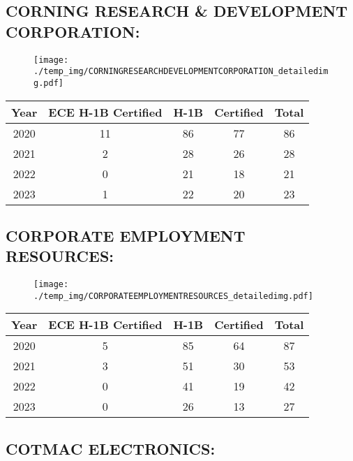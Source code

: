 \documentclass{article}%
\begin{document}
%
\newpage%
\subsection{CORNING RESEARCH \& DEVELOPMENT CORPORATION:}%
\label{subsec:CORNINGRESEARCHDEVELOPMENTCORPORATION}%
\label{CORNINGRESEARCHDEVELOPMENTCORPORATIONdetailed}%


\begin{figure}[htbp]%
\centering%
\texttt{[image: ./temp\_img/CORNINGRESEARCHDEVELOPMENTCORPORATION\_detailedimg.pdf]}%
\end{figure}

%
\begin{longtable}{c|c|c|c|c}%
\hline%
Year&ECE H{-}1B Certified&H{-}1B&Certified&Total\\%
\hline%
2020&11&86&77&86\\%
\hline%
2021&2&28&26&28\\%
\hline%
2022&0&21&18&21\\%
\hline%
2023&1&22&20&23\\%
\hline%
\end{longtable}

%
\newpage%
\subsection{CORPORATE EMPLOYMENT RESOURCES:}%
\label{subsec:CORPORATEEMPLOYMENTRESOURCES}%
\label{CORPORATEEMPLOYMENTRESOURCESdetailed}%


\begin{figure}[htbp]%
\centering%
\texttt{[image: ./temp\_img/CORPORATEEMPLOYMENTRESOURCES\_detailedimg.pdf]}%
\end{figure}

%
\begin{longtable}{c|c|c|c|c}%
\hline%
Year&ECE H{-}1B Certified&H{-}1B&Certified&Total\\%
\hline%
2020&5&85&64&87\\%
\hline%
2021&3&51&30&53\\%
\hline%
2022&0&41&19&42\\%
\hline%
2023&0&26&13&27\\%
\hline%
\end{longtable}

%
\newpage%
\subsection{COTMAC ELECTRONICS:}%
\label{subsec:COTMACELECTRONICS}%
\label{COTMACELECTRONICSdetailed}%
\end{document}
